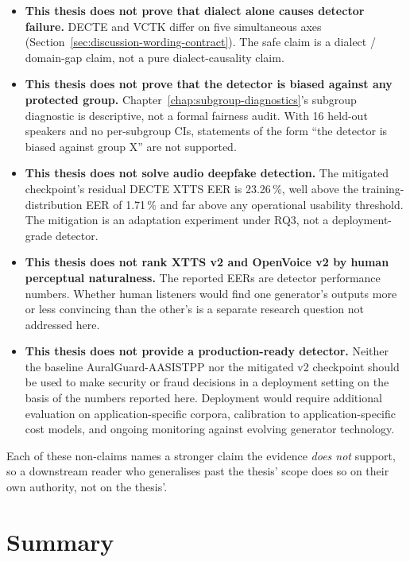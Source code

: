 \begin{itemize}
    \item \textbf{This thesis does not prove that dialect alone causes detector
        failure.} DECTE and VCTK differ on five simultaneous axes
        (Section~\ref{sec:discussion-wording-contract}). The safe claim is a dialect / domain-gap claim,
        not a pure dialect-causality claim.
    \item \textbf{This thesis does not prove that the detector is biased against
        any protected group.} Chapter~\ref{chap:subgroup-diagnostics}'s subgroup diagnostic is
        descriptive, not a formal fairness audit. With 16 held-out
        speakers and no per-subgroup CIs, statements of the form ``the
        detector is biased against group X'' are not supported.
    \item \textbf{This thesis does not solve audio deepfake detection.} The
        mitigated checkpoint's residual DECTE XTTS EER is 23.26\,\%,
        well above the training-distribution EER of 1.71\,\% and far
        above any operational usability threshold. The mitigation is
        an adaptation experiment under RQ3, not a deployment-grade
        detector.
    \item \textbf{This thesis does not rank XTTS v2 and OpenVoice v2 by human
        perceptual naturalness.} The reported EERs are detector
        performance numbers. Whether human listeners would find one
        generator's outputs more or less convincing than the other's
        is a separate research question not addressed here.
    \item \textbf{This thesis does not provide a production-ready detector.}
        Neither the baseline AuralGuard-AASISTPP nor the mitigated v2
        checkpoint should be used to make security or fraud decisions
        in a deployment setting on the basis of the numbers reported
        here. Deployment would require additional evaluation on
        application-specific corpora, calibration to
        application-specific cost models, and ongoing monitoring
        against evolving generator technology.
\end{itemize}

Each of these non-claims names a stronger claim the evidence
\emph{does not} support, so a downstream reader who generalises
past the thesis' scope does so on their own authority, not on
the thesis'.


\section{Summary}
\label{sec:discussion-summary}

